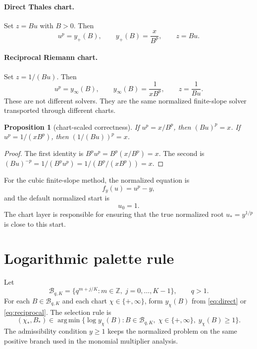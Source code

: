 \documentclass[11pt]{article}
\newtheorem{proposition}{Proposition}
\DeclareMathOperator*{\argmin}{arg\,min}
\begin{document}
\paragraph{Direct Thales chart.}
Set $z=Bu$ with $B>0$.  Then
\begin{equation}
u^p=y_+(B),\qquad y_+(B)=\frac{x}{B^p},\qquad z=Bu.
\label{eq:direct}
\end{equation}

\paragraph{Reciprocal Riemann chart.}
Set $z=1/(Bu)$.  Then
\begin{equation}
u^p=y_\infty(B),\qquad y_\infty(B)=\frac{1}{xB^p},\qquad z=\frac{1}{Bu}.
\label{eq:reciprocal}
\end{equation}
These are not different solvers.  They are the same normalized finite-slope solver transported through different charts.

\begin{proposition}[chart-scaled correctness]
If $u^p=x/B^p$, then $(Bu)^p=x$.  If $u^p=1/(xB^p)$, then $(1/(Bu))^p=x$.
\end{proposition}

\begin{proof}
The first identity is $B^pu^p=B^p(x/B^p)=x$.  The second is $(Bu)^{-p}=1/(B^pu^p)=1/(B^p/(xB^p))=x$.
\end{proof}

For the cubic finite-slope method, the normalized equation is
\[
f_y(u)=u^p-y,
\]
and the default normalized start is
\[
u_0=1.
\]
The chart layer is responsible for ensuring that the true normalized root $u_*=y^{1/p}$ is close to this start.

\section{Logarithmic palette rule}
Let
\[
\mathcal B_{q,K}=\{q^{m+j/K}:m\in\mathbb Z,\;j=0,\ldots,K-1\},\qquad q>1.
\]
For each $B\in\mathcal B_{q,K}$ and each chart $\chi\in\{+,\infty\}$, form $y_\chi(B)$ from \eqref{eq:direct} or \eqref{eq:reciprocal}.  The selection rule is
\begin{equation}
(\chi_*,B_*)\in\argmin\bigl\{\log y_\chi(B):B\in\mathcal B_{q,K},\;\chi\in\{+,\infty\},\;y_\chi(B)\ge1\bigr\}.
\label{eq:selector}
\end{equation}
The admissibility condition $y\ge1$ keeps the normalized problem on the same positive branch used in the monomial multiplier analysis.
\end{document}

